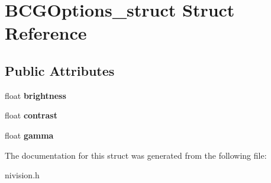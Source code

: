 \hypertarget{structBCGOptions__struct}{\section{\-B\-C\-G\-Options\-\_\-struct \-Struct \-Reference}
\label{structBCGOptions__struct}
}
\subsection*{\-Public \-Attributes}
\begin{DoxyCompactItemize}
\item 
\hypertarget{structBCGOptions__struct_a2d1099b355f750368416e1785044af10}{float {\bfseries brightness}}\label{structBCGOptions__struct_a2d1099b355f750368416e1785044af10}

\item 
\hypertarget{structBCGOptions__struct_a7871b385e199636c8d057f8f567c5aae}{float {\bfseries contrast}}\label{structBCGOptions__struct_a7871b385e199636c8d057f8f567c5aae}

\item 
\hypertarget{structBCGOptions__struct_a3a24b83f7b84ca3ecd90a1e4e6361d7b}{float {\bfseries gamma}}\label{structBCGOptions__struct_a3a24b83f7b84ca3ecd90a1e4e6361d7b}

\end{DoxyCompactItemize}


\-The documentation for this struct was generated from the following file\-:\begin{DoxyCompactItemize}
\item 
nivision.\-h\end{DoxyCompactItemize}
